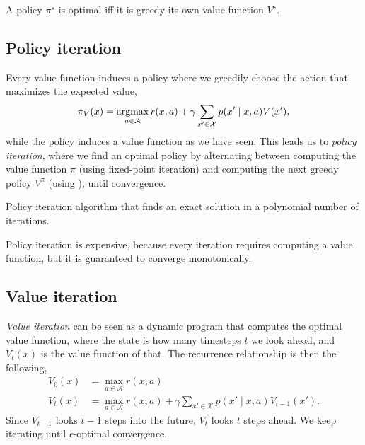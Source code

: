 \begin{theorem} \label{thm:bellman}
    A policy $\pi^\star$ is optimal iff it is greedy \wrt its own value function
    $V^\star$.
\end{theorem}

\subsection{Policy iteration}

Every value function induces a policy where we greedily choose the action that
maximizes the expected value,
\begin{equation}
    \pi_V(x) = \argmax_{a\in\mathcal{A}} r(x,a) + \gamma \sum_{x'\in\mathcal{X}} p(x'\mid x,a) V(x')
    \label{eq:greedy-policy}
    ,\end{equation}
while the policy induces a value function as we have seen. This leads us to
\textit{policy iteration}, where we find an optimal policy by alternating
between computing the value function \wrt $\pi$ (using fixed-point iteration)
and computing the next greedy policy \wrt $V^\pi$ (using
), until convergence.

\begin{algorithm}[h]
    \caption{Policy iteration algorithm that finds an exact solution in a
        polynomial number of iterations.}
    \label{alg:policy-iteration}
    \begin{algorithmic}
        \EndWhile
        \State {\Return $\pi$}
        \EndFunction
    \end{algorithmic}
\end{algorithm}

Policy iteration is expensive, because every iteration requires computing a
value function, but it is guaranteed to converge monotonically.

\subsection{Value iteration}

\textit{Value iteration} can be seen as a dynamic program that computes the
optimal value function, where the state is how many timesteps $t$ we look
ahead, and $V_t(x)$ is the value function of that. The recurrence relationship
is then the following,
\begin{align*}
    V_0(x) & = \max_{a\in\mathcal{A}} r(x,a)                                                              \\
    V_t(x) & = \max_{a\in\mathcal{A}} r(x, a) + \gamma \sum_{x'\in\mathcal{X}} p(x'\mid x,a) V_{t-1}(x').
\end{align*}
Since $V_{t-1}$ looks $t-1$ steps into the future, $V_t$ looks $t$ steps ahead.
We keep iterating until $\epsilon$-optimal
convergence.


